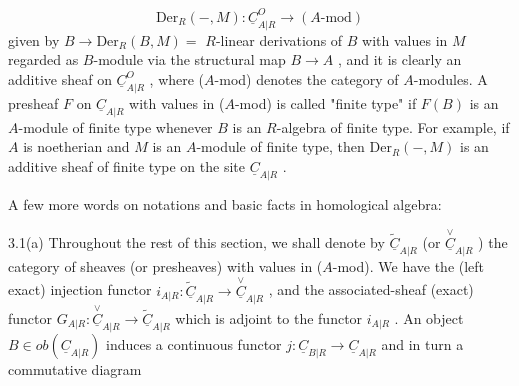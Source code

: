 \begin{equation*}
\mathrm{Der}_R(-,M): \underline{C}^{O}_{A|R} \to (A\text{-mod})
\end{equation*}
given by  $B \to \mathrm{Der}_R(B,M) =$ $R$-linear derivations of  $B$  with values in  $M$  regarded as $B$-module via the structural map  $B \to A$ , and it is clearly an additive sheaf on  $\underline{C}^{O}_{A|R}$ , where ($A$-mod) denotes the category of $A$-modules. A presheaf  $F$  on  $\underline{C}_{A|R}$  with values in  ($A$-mod)  is called "finite type" if  $F(B)$  is an $A$-module of finite type whenever  $B$  is an $R$-algebra of finite type. For example, if  $A$  is noetherian and  $M$  is an $A$-module of finite type, then  $\mathrm{Der}_R(-,M)$  is an additive sheaf of finite type on the site  $\underline{C}_{A|R}$ .

A few more words on notations and basic facts in homological algebra:

3.1(a)  Throughout the rest of this section, we shall denote by  $\widetilde{\underline{C}}_{A|R}$  (or  $\overset{\vee}{\underline{C}}_{A|R}$ )  the category of sheaves (or presheaves) with values in ($A$-mod). We have the (left exact) injection functor  $i_{A|R}: \widetilde{\underline{C}}_{A|R} \to \overset{\vee}{\underline{C}}_{A|R}$ , and the associated-sheaf (exact)
functor  $G_{A|R}: \overset{\vee}{\underline{C}}_{A|R} \to \widetilde{\underline{C}}_{A|R}$  which is adjoint to the functor  $i_{A|R}$ . An object  $B \in ob(\underline{C}_{A|R})$  induces a continuous functor  $j : \underline{C}_{B|R} \to \underline{C}_{A|R}$  and in turn a commutative diagram

